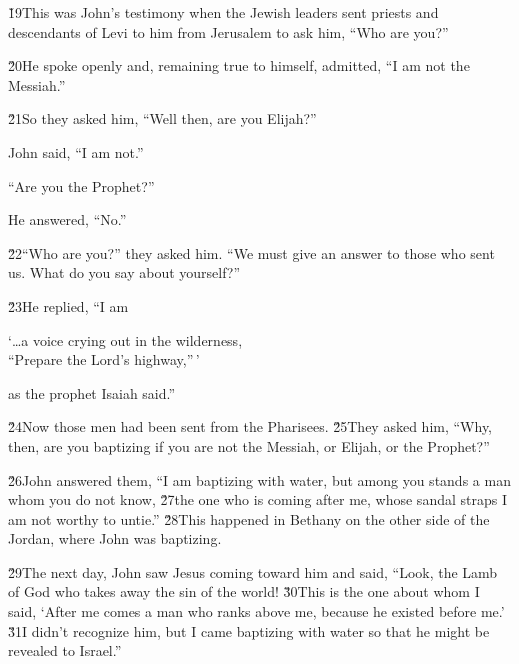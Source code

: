 \v{19}This was John's testimony when the Jewish leaders sent priests and descendants of Levi to him from Jerusalem to ask him, ``Who are you?''

\v{20}He spoke openly and, remaining true to himself, admitted, ``I am not the Messiah.''

\v{21}So they asked him, ``Well then, are you Elijah?''

John said, ``I am not.''

``Are you the Prophet?''

He answered, ``No.''

\v{22}``Who are you?'' they asked him. ``We must give an answer to those who sent us. What do you say about yourself?''

\v{23}He replied, ``I am

\begin{poetry}
\poeml `{\ldots}a voice crying out in the wilderness, \\
\poemll    ``Prepare the Lord's highway,''\,'
\end{poetry}

as the prophet Isaiah said.''

\v{24}Now those men had been sent from the Pharisees. \v{25}They asked him, ``Why, then, are you baptizing if you are not the Messiah, or Elijah, or the Prophet?''

\v{26}John answered them, ``I am baptizing with water, but among you stands a man whom you do not know, \v{27}the one who is coming after me, whose sandal straps I am not worthy to untie.'' \v{28}This happened in Bethany on the other side of the Jordan, where John was baptizing.

\v{29}The next day, John saw Jesus coming toward him and said, ``Look, the Lamb of God who takes away the sin of the world! \v{30}This is the one about whom I said, `After me comes a man who ranks above me, because he existed before me.' \v{31}I didn't recognize him, but I came baptizing with water so that he might be revealed to Israel.''

